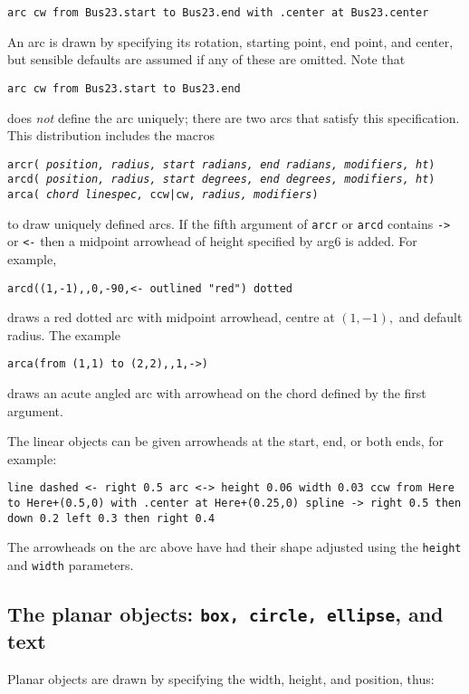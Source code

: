 {\tt arc cw from Bus23.start to Bus23.end with .center at Bus23.center}

An arc is drawn by specifying its rotation, starting point, end point, and
center, but sensible defaults are assumed if any of these are omitted.
Note that

{\tt arc cw from Bus23.start to Bus23.end}

\noindent
does {\em not} define the arc uniquely; there are two arcs that satisfy this
specification.
This distribution includes the \Mfour macros

{\tt arcr( {\sl position, radius, start radians, end radians, modifiers, ht})
\hfill\break\indent
     arcd( {\sl position, radius, start degrees, end degrees, modifiers, ht})
\hfill\break\indent
     arca( {\sl chord linespec,} ccw|cw, {\sl radius, modifiers})
}

\noindent to draw uniquely defined arcs.
If the fifth argument of {\tt arcr} or {\tt arcd} contains {\tt ->} or {\tt <-}
then a midpoint arrowhead of height specified by arg6 is added.
For example,

{\tt arcd((1,-1),{},0,-90,<- outlined "red") dotted}

\noindent draws a red dotted arc with midpoint arrowhead,
 centre at $(1,-1),$ and default radius.
 The example

{\tt arca(from (1,1) to (2,2),{,}1,->)}

\noindent draws an acute angled arc with arrowhead on the chord defined by the
first argument.

The linear objects can be given arrowheads at the start, end, or both ends,
for example:

{\tt line dashed <- right 0.5\hfill\break
\hspace*{\parindent}%
arc <-> height 0.06 width 0.03 ccw from Here to Here+(0.5,0)
 \hfill\break
\hspace*{2\parindent}%
   with .center at Here+(0.25,0)\hfill\break
\hspace*{\parindent}%
spline -> right 0.5 then down 0.2 left 0.3 then right 0.4}

The arrowheads on the arc above have had their shape adjusted using the
{\tt height} and {\tt width} parameters.

\subsection{The planar objects: {\tt box, circle, ellipse}, and text%
\label{Planarobjects:}}
Planar objects are drawn by specifying the width, height, and position, thus:

